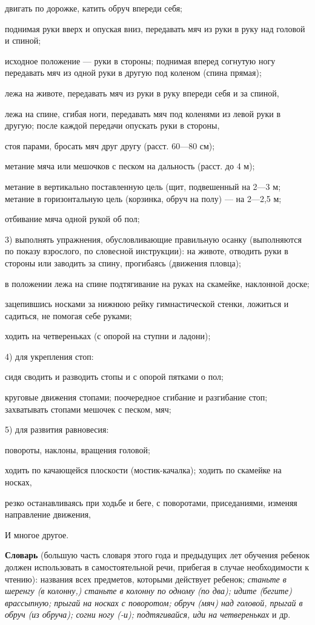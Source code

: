 \documentclass{book}
\renewcommand{\emph}[1]{\textit{#1}}
\begin{document}
двигать по дорожке, катить обруч впереди себя;

поднимая руки вверх и опуская вниз, передавать мяч из руки в руку над
головой и спиной;

исходное положение --- руки в стороны; поднимая вперед согнутую ногу
передавать мяч из одной руки в другую под коленом (спина прямая);

лежа на животе, передавать мяч из руки в руку впереди себя и за спиной,

лежа на спине, сгибая ноги, передавать мяч под коленями из левой руки в
другую; после каждой передачи опускать руки в стороны,

стоя парами, бросать мяч друг другу (расст. 60---80 см);

метание мяча или мешочков с песком на дальность (расст. до 4 м);

метание в вертикально поставленную цель (щит, подвешенный на 2---3 м;
метание в горизонтальную цель (корзинка, обруч на полу) --- на 2---2,5
м;

отбивание мяча одной рукой об пол;

3) выполнять упражнения, обусловливающие правильную осанку (выполняются
по показу взрослого, по словесной инструкции): на животе, отводить руки
в стороны или заводить за спину, прогибаясь (движения пловца);

в положении лежа на спине подтягивание на руках на скамейке, наклонной
доске;

зацепившись носками за нижнюю рейку гимнастической стенки, ложиться и
садиться, не помогая себе руками;

ходить на четвереньках (с опорой на ступни и ладони);

4) для укрепления стоп:

сидя сводить и разводить стопы и с опорой пятками о пол;

круговые движения стопами; поочередное сгибание и разгибание стоп;
захватывать стопами мешочек с песком, мяч;

5) для развития равновесия:

повороты, наклоны, вращения головой;

ходить по качающейся плоскости (мостик-качалка); ходить по скамейке на
носках,

резко останавливаясь при ходьбе и беге, с поворотами, приседаниями,
изменяя направление движения,

И многое другое.

\textbf{Словарь} (большую часть словаря этого года и предыдущих лет
обучения ребенок должен использовать в самостоятельной речи, прибегая в
случае необходимости к чтению): названия всех предметов, которыми
действует ребенок; \emph{станьте в шеренгу (в колонну,) станьте в
колонну по одному (по два); идите (бегите) врассыпную; прыгай на носках
с поворотом; обруч (мяч) над головой, прыгай в обруч (из обруча); согни
ногу (-и); подтягивайся, иди на четвереньках} и др.
\end{document}
